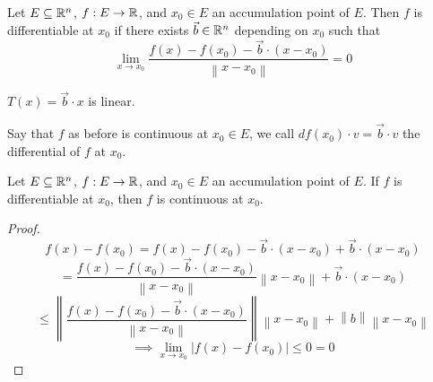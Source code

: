 \documentclass[11pt]{article}
\newcommand{\norm}[1]{\left\lVert #1 \right\rVert}
\newcommand{\ra}{\rightarrow}
\begin{document}
\begin{definition}[Differentiability]
    Let $E \subseteq \mathbb{R}^n$, $f: E \ra \R$, and $x_0 \in E$ an accumulation point of $E$. Then $f$ is differentiable at $x_0$ if there exists $\vec{b} \in \mathbb{R}^n$ depending on $x_0$ such that 
    \[\lim_{x \ra x_0} \frac{f(x) - f(x_0) - \vec{b}\cdot (x-x_0)}{\norm{x-x_0}} = 0\]
\end{definition}

\begin{remark}
    $T(x) = \vec{b} \cdot x$ is linear. 
\end{remark}

\begin{definition}[Differentials]
    Say that $f$ as before is continuous at $x_0 \in E$, we call $df(x_0) \cdot v = \vec{b} \cdot v$ the differential of $f$ at $x_0$.
\end{definition}

\begin{theorem}
    Let $E \subseteq \mathbb{R}^n$, $f: E \ra \R$, and $x_0 \in E$ an accumulation point of $E$. If $f$ is differentiable at $x_0$, then $f$ is continuous at $x_0$.
    \begin{proof}
        \[f(x) - f(x_0) = f(x) - f(x_0) - \vec{b} \cdot (x-x_0) + \vec{b} \cdot (x - x_0)\]
        \[=\frac{f(x) - f(x_0) - \vec{b}\cdot (x-x_0)}{\norm{x-x_0}}\norm{x - x_0} + \vec{b} \cdot (x - x_0) \]
        \[\leq \norm{\frac{f(x) - f(x_0) - \vec{b}\cdot (x-x_0)}{\norm{x-x_0}}}\norm{x-x_0} + \norm{b}\norm{x - x_0}\]
        \[\implies \lim_{x \ra x_0} | f(x) - f(x_0)| \leq 0 = 0\]
    \end{proof}
\end{theorem}
\end{document}
